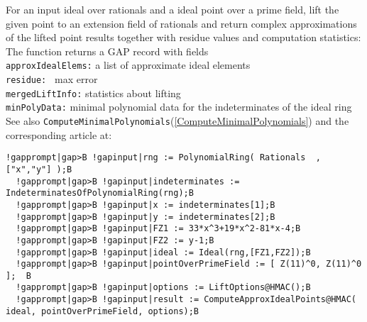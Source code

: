 \documentclass[a4paper,11pt]{report}
\begin{document}
{{{ For an input ideal over rationals and a ideal point over a prime field, lift
the given point to an extension field of rationals and return complex
approximations of the lifted point results together with residue values and
computation statistics: \\
 The function returns a GAP record with fields\\
 \texttt{approxIdealElems:} a list of approximate ideal elements\\
 \texttt{residue: } max error \\
 \texttt{mergedLiftInfo:} statistics about lifting \\
 \texttt{minPolyData:} minimal polynomial data for the indeterminates of the ideal ring\\
 See also \texttt{ComputeMinimalPolynomials}(\ref{ComputeMinimalPolynomials}) and the corresponding article at: }

 
\begin{Verbatim}[commandchars=!|B,fontsize=\small,frame=single,label=Example]
  !gapprompt|gap>B !gapinput|rng := PolynomialRing( Rationals  ,["x","y"] );B
  !gapprompt|gap>B !gapinput|indeterminates := IndeterminatesOfPolynomialRing(rng);B
  !gapprompt|gap>B !gapinput|x := indeterminates[1];B
  !gapprompt|gap>B !gapinput|y := indeterminates[2];B
  !gapprompt|gap>B !gapinput|FZ1 := 33*x^3+19*x^2-81*x-4;B
  !gapprompt|gap>B !gapinput|FZ2 := y-1;B
  !gapprompt|gap>B !gapinput|ideal := Ideal(rng,[FZ1,FZ2]);B
  !gapprompt|gap>B !gapinput|pointOverPrimeField := [ Z(11)^0, Z(11)^0 ];  B
  !gapprompt|gap>B !gapinput|options := LiftOptions@HMAC();B
  !gapprompt|gap>B !gapinput|result := ComputeApproxIdealPoints@HMAC( ideal, pointOverPrimeField, options);B
  
\end{Verbatim}
 }

 }

 
\end{document}
